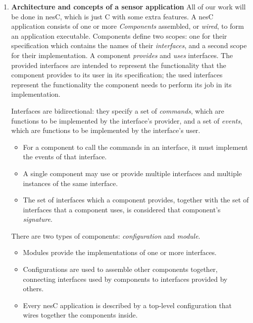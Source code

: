 \documentclass[letterpaper,12pt]{article}
\begin{document}
\begin{enumerate}
\item \textbf{Architecture and concepts of a sensor application}
    All of our work will be done in nesC, which is just C with some extra features.
    A nesC application consists of one or more \emph{Components} assembled, or \emph{wired},
    to form an application executable. Components define two scopes: one for
    their specification which contains the names of their \emph{interfaces},
    and a second scope for their implementation. A component \emph{provides} and \emph{uses}
    interfaces. The provided interfaces are intended to represent the
    functionality that the component provides to its user in its specification;
    the used interfaces represent the functionality the component needs to
    perform its job in its implementation.

    Interfaces are bidirectional: they specify a set of \emph{commands}, which
    are functions to be implemented by the interface's provider, and a set of
    \emph{events}, which are functions to be implemented by the interface's user.
    \begin{itemize}
        \item For a component to call the commands in an interface, it must
              implement the events of that interface.
        \item A single component may use or provide multiple interfaces and
              multiple instances of the same interface.
        \item The set of interfaces which a component provides,
              together with the set of interfaces that a component uses,
              is considered that component's \emph{signature}. 
    \end{itemize}

    There are two types of components: \emph{configuration} and \emph{module}.
    \begin{itemize}
        \item Modules provide the implementations of one or more interfaces.
        \item Configurations are used to assemble other components together,
              connecting interfaces used by components to interfaces provided
              by others.
        \item Every nesC application is described by a top-level configuration
              that wires together the components inside. 
    \end{itemize}
    

\end{enumerate}
\end{document}
